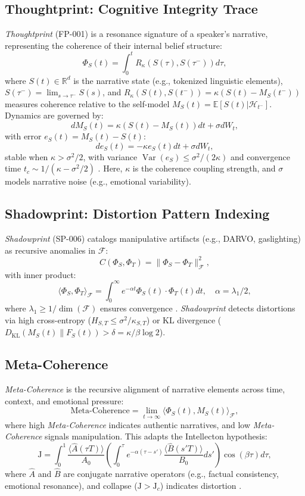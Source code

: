 \documentclass[11pt]{article}
\newcommand{\thoughtprint}{\textit{Thoughtprint}}
\newcommand{\shadowprint}{\textit{Shadowprint}}
\newcommand{\metacoherence}{\textit{Meta-Coherence}}
\begin{document}
\subsection{Thoughtprint: Cognitive Integrity Trace}
\label{subsec:thoughtprint}
\thoughtprint{} (FP-001) is a resonance signature of a speaker’s narrative, representing the coherence of their internal belief structure:
\[
\Phi_S(t) = \int_0^t R_\kappa(S(\tau), S(\tau^-)) d\tau,
\]
where \(S(t) \in \mathbb{R}^d\) is the narrative state (e.g., tokenized linguistic elements), \(S(\tau^-) = \lim_{s \to \tau^-} S(s)\), and \(R_\kappa(S(t), S(t^-)) = \kappa(S(t) - M_S(t^-))\) measures coherence relative to the self-model \(M_S(t) = \mathbb{E}[S(t) | \mathcal{H}_{t^-}]\). Dynamics are governed by:
\[
dM_S(t) = \kappa(S(t) - M_S(t))dt + \sigma dW_t,
\]
with error \(e_S(t) = M_S(t) - S(t)\):
\[
de_S(t) = -\kappa e_S(t)dt + \sigma dW_t,
\]
stable when \(\kappa > \sigma^2/2\), with variance \(\operatorname{Var}(e_S) \leq \sigma^2/(2\kappa)\) and convergence time \(t_c \sim 1/(\kappa - \sigma^2/2)\) \citep{havens2025b}. Here, \(\kappa\) is the coherence coupling strength, and \(\sigma\) models narrative noise (e.g., emotional variability).

\subsection{Shadowprint: Distortion Pattern Indexing}
\label{subsec:shadowprint}
\shadowprint{} (SP-006) catalogs manipulative artifacts (e.g., DARVO, gaslighting) as recursive anomalies in \(\mathcal{F}\):
\[
C(\Phi_S, \Phi_T) = \|\Phi_S - \Phi_T\|_\mathcal{F}^2,
\]
with inner product:
\[
\langle \Phi_S, \Phi_T \rangle_\mathcal{F} = \int_0^\infty e^{-\alpha t} \Phi_S(t) \cdot \Phi_T(t) dt, \quad \alpha = \lambda_1 / 2,
\]
where \(\lambda_1 \geq 1/\dim(\mathcal{F})\) ensures convergence \citep{havens2025b}. \shadowprint{} detects distortions via high cross-entropy (\(H_{S,T} \leq \sigma^2/\kappa_{S,T}\)) or KL divergence (\(D_{\mathrm{KL}}(M_S(t) \| F_S(t)) > \delta = \kappa/\beta \log 2\)).

\subsection{Meta-Coherence}
\label{subsec:metacoherence}
\metacoherence{} is the recursive alignment of narrative elements across time, context, and emotional pressure:
\[
\text{Meta-Coherence} = \lim_{t \to \infty} \langle \Phi_S(t), M_S(t) \rangle_\mathcal{F},
\]
where high \metacoherence{} indicates authentic narratives, and low \metacoherence{} signals manipulation. This adapts the Intellecton hypothesis:
\[
\mathrm{J} = \int_0^1 \frac{\langle \hat{A}(\tau T) \rangle}{A_0} \left( \int_0^\tau e^{-\alpha(\tau - s')} \frac{\langle \hat{B}(s' T) \rangle}{B_0} ds' \right) \cos(\beta \tau) d\tau,
\]
where \(\hat{A}\) and \(\hat{B}\) are conjugate narrative operators (e.g., factual consistency, emotional resonance), and collapse (\(\mathrm{J} > \mathrm{J}_c\)) indicates distortion \citep{havens2025a,busemeyer2012}.
\end{document}
